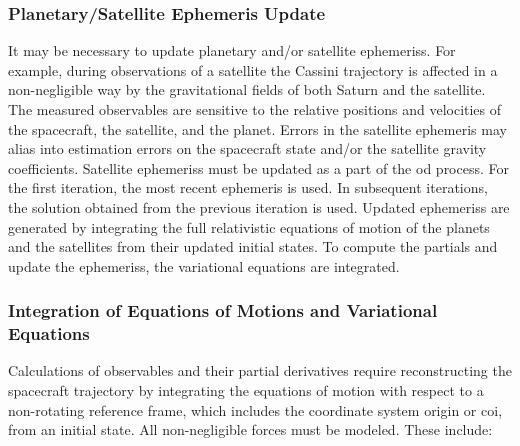 \documentclass{article}
\theoremstyle{mystyle}
\begin{document}
\subsubsection{\footnotesize Planetary/Satellite Ephemeris Update}

It may be necessary to update planetary and/or satellite \glspl{ephemeris}. For example, during observations of a satellite the Cassini trajectory is affected in a non-negligible way by the \glspl{gravitational field} of both Saturn and the satellite. The measured observables are sensitive to the relative positions and velocities of the spacecraft, the satellite, and the planet. Errors in the satellite \gls{ephemeris} may alias into estimation errors on the spacecraft state and/or the satellite gravity coefficients. Satellite \glspl{ephemeris} must be updated as a part of the \gls{od} process. For the first iteration, the most recent \gls{ephemeris} is used. In subsequent iterations, the solution obtained from the previous iteration is used. Updated \glspl{ephemeris} are generated by integrating the full relativistic \gls{equations of motion} of the planets and the satellites from their updated initial states. To compute the partials and update the \glspl{ephemeris}, the \glspl{variational equation} are integrated.

\subsubsection{\footnotesize Integration of Equations of Motions and Variational Equations}

Calculations of observables and their partial derivatives require reconstructing the spacecraft trajectory by integrating the \gls{equations of motion} with respect to a non-rotating reference frame, which includes the coordinate system origin or \gls{coi}, from an initial state. All non-negligible forces must be modeled. These include:
\end{document}
